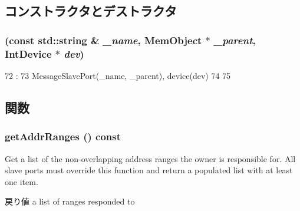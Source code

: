 \subsection{コンストラクタとデストラクタ}
\hypertarget{classX86ISA_1_1IntDevice_1_1IntSlavePort_af04466913e558c12860c108bf2f30d00}{
\subsubsection[{IntSlavePort}]{ (const std::string \& {\em \_\-name}, \/  {\bf MemObject} $\ast$ {\em \_\-parent}, \/  {\bf IntDevice} $\ast$ {\em dev})}}
\label{classX86ISA_1_1IntDevice_1_1IntSlavePort_af04466913e558c12860c108bf2f30d00}



\begin{DoxyCode}
72                                      :
73             MessageSlavePort(_name, _parent), device(dev)
74         {
75         }

\end{DoxyCode}


\subsection{関数}
\hypertarget{classX86ISA_1_1IntDevice_1_1IntSlavePort_a36cf113d5e5e091ebddb32306c098fae}{
\subsubsection[{getAddrRanges}]{ getAddrRanges () const}}
\label{classX86ISA_1_1IntDevice_1_1IntSlavePort_a36cf113d5e5e091ebddb32306c098fae}
Get a list of the non-\/overlapping address ranges the owner is responsible for. All slave ports must override this function and return a populated list with at least one item.

\begin{DoxyReturn}{戻り値}
a list of ranges responded to 
\end{DoxyReturn}


